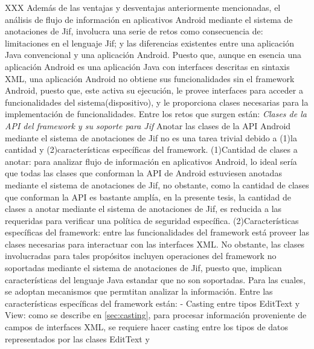 XXX\newline
Además de las ventajas y desventajas anteriormente mencionadas, el análisis de
flujo de información en aplicativos Android mediante el sistema de anotaciones
de Jif, involucra una serie de retos como consecuencia de: limitaciones
en el lenguaje Jif; y las diferencias existentes entre una aplicación Java
convencional y una aplicación Android. Puesto que, aunque en esencia
una aplicación Android es una aplicación Java con interfaces descritas en
sintaxis XML, una aplicación Android no obtiene sus funcionalidades sin el
framework Android, puesto que, este activa su ejecución, le provee interfaces
para acceder a funcionalidades del sistema(dispositivo), y le proporciona clases
necesarias para la implementación de funcionalidades.\newline
Entre los retos que surgen están:\newline 
\emph{Clases de la API del framework y su soporte para Jif}\newline 
Anotar las clases de la API Android mediante el sistema de anotaciones de Jif no
es una tarea trivial debido a (1)la cantidad y (2)características específicas
del framework.\newline 
(1)Cantidad de clases a anotar: para analizar flujo de información en
aplicativos Android, lo ideal sería que todas las clases que conforman la API de
Android estuviesen anotadas mediante el sistema de anotaciones de Jif, no
obstante, como la cantidad de clases que conforman la API es bastante amplía, en
la presente tesis, la cantidad de clases a anotar mediante el sistema de
anotaciones de Jif, es reducida a las requeridas para verificar una política de
seguridad específica.\newline 
(2)Características específicas del framework: entre las funcionalidades del
framework está proveer las clases necesarias para interactuar con las interfaces
XML. No obstante, las clases involucradas para tales propósitos incluyen
operaciones del framework no soportadas mediante el sistema de anotaciones de
Jif, puesto que, implican características del lenguaje Java estandar que no son
soportadas. Para las cuales, se adoptan mecanismos que permtitan analizar la
información. Entre las características específicas del framework
están:\newline 
- Casting entre tipos EditText y View: como se describe en
\ref{sec:casting}, para procesar información proveniente de campos de interfaces XML, se requiere
hacer casting entre los tipos de datos representados por las clases EditText y
